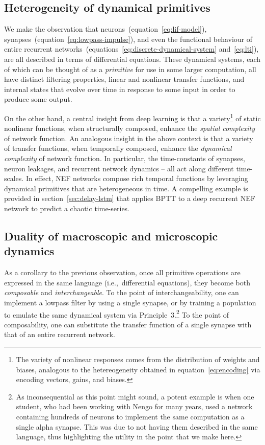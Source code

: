 \subsection{Heterogeneity of dynamical primitives}

We make the observation that neurons~(equation~\ref{eq:lif-model}), synapses~(equation~\ref{eq:lowpass-impulse}), and even the functional behaviour of entire recurrent networks~(equations~\ref{eq:discrete-dynamical-system} and~\ref{eq:lti}), are all described in terms of differential equations.
These dynamical systems, each of which can be thought of as a \emph{primitive} for use in some larger computation, all have distinct filtering properties, linear and nonlinear transfer functions, and internal states that evolve over time in response to some input in order to produce some output.

On the other hand, a central insight from deep learning is that a variety\footnote{%
The variety of nonlinear responses comes from the distribution of weights and biases, analogous to the hetereogeneity obtained in equation~\ref{eq:encoding} via encoding vectors, gains, and biases.}
of static nonlinear functions, when structurally composed, enhance the \emph{spatial complexity} of network function.
An analogous insight in the above context is that a variety of transfer functions, when temporally composed, enhance the \emph{dynamical complexity} of network function.
In particular, the time-constants of synapses, neuron leakages, and recurrent network dynamics -- all act along different time-scales.
In effect, NEF networks compose rich temporal functions by leveraging dynamical primitives that are heterogeneous in time.
A compelling example is provided in section~\ref{sec:delay-lstm} that applies BPTT to a deep recurrent NEF network to predict a chaotic time-series.

\subsection{Duality of macroscopic and microscopic dynamics}

As a corollary to the previous observation,
once all primitive operations are expressed in the same language (i.e.,~differential equations), they become both \emph{composable} and \emph{interchangeable}.
To the point of interchangeability, one can implement a lowpass filter by using a single synapse, or by training a population to emulate the same dynamical system via Principle~3.\footnote{%
As inconsequential as this point might sound, a potent example is when one student, who had been working with Nengo for many years, used a network containing hundreds of neurons to implement the same computation as a single alpha synapse. This was due to not having them described in the same language, thus highlighting the utility in the point that we make here.}
To the point of composability, one can substitute the transfer function of a single synapse with that of an entire recurrent network.

